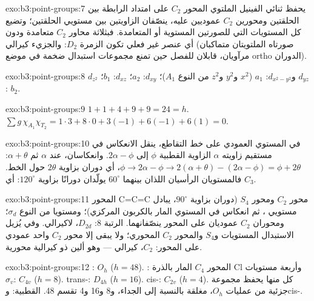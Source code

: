 \begin{solution}{exo:b3:point-groups:7}
يحفظ ثنائي الفينيل الملتوي المحور $C_2$ على امتداد الرابطة بين الحلقتين ومحورين $C_2$
عموديين عليه، ينصّفان الزاويتين بين مستويي الحلقتين؛ وتضيع كل
المستويات  التي للصورتين المستوية أو المتعامدة.
فبثلاثة محاور $C_2$ متعامدة ودون أي عنصر غير فعلي تكون الزمرة
$D_2$: والجزيء كيرالي (صورتاه الملتويتان متماكبان مرآويان،
قابلان للفصل حين تمنع مجموعات استبدال ضخمة في موضع ortho الدوران).
\end{solution}

\begin{solution}{exo:b3:point-groups:8}
$d_{z^2}$ و$d_{x^2-y^2}$: $a_1$ ($x^2$ و$y^2$ و$z^2$ من النوع $A_1$)؛ $d_{xy}$: $a_2$؛ $d_{xz}$:
$b_1$؛ $d_{yz}$: $b_2$.
\end{solution}

\begin{solution}{exo:b3:point-groups:9}
$1 + 1 + 4 + 9 + 9 = 24 = h$. $\sum g\,\chi_{A_1}\chi_{T_2} = 1\cdot3 + 8\cdot0 + 3(-1)
+ 6(-1) + 6(1) = 0$.
\end{solution}

\begin{solution}{exo:b3:point-groups:10}
في المستوي العمودي على خط التقاطع، ينقل الانعكاس في مستقيم
زاويته $\alpha$ الزاوية القطبية $\phi$ إلى $2\alpha - \phi$. وانعكاسان، عند
$\alpha$ ثم $\alpha + \theta$: $\phi \to 2\alpha - \phi \to 2(\alpha + \theta) - (2\alpha - \phi) =
\phi + 2\theta$، أي دوران بزاوية $2\theta$ حول الخط. فالمستويان الرأسيان اللذان بينهما
$60^\circ$ يولّدان دورانًا بزاوية $120^\circ$: أي $C_3$.
\end{solution}

\begin{solution}{exo:b3:point-groups:11}
المحور C=C=C محور $C_2$ ومحور $S_4$ (دوران بزاوية $90^\circ$، يبادل
مستويي ، ثم انعكاس في المستوي المار بالكربون المركزي)؛ 
ومستويا  من النوع $\sigma_d$؛ ومحوران $C_2$ عموديان على المحور ينصّفانهما.
الرتبة 8: $D_{2d}$، لاكيرالي. وفي  يُزيل الاستبدال المستويات و$S_4$ 
والمحور $C_2$ المحوري؛ ولا يبقى إلا محور $C_2$ واحد عمودي على
المحور: $C_2$، كيرالي --- وهو ألين ذو كيرالية محورية.
\end{solution}

\begin{solution}{exo:b3:point-groups:12}
: $O_h$ ($h = 48$). : المحور $C_4$ المار بالذرة Cl وأربعة مستويات $\sigma_v$:
$C_{4v}$ ($h = 8$). trans-: $D_{4h}$ ($h = 16$). cis-: $C_{2v}$ ($h
= 4$). كل منها يحفظ مجموعة جزئية من عمليات $O_h$، مغلقة بالنسبة إلى الجداء،
و8 و16 و4 تقسم 48. القطبية:  وcis-.
\end{solution}

